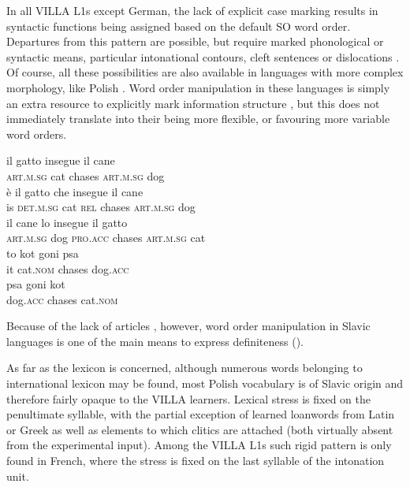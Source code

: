 In all VILLA L1s except German, the lack of explicit case marking results in syntactic functions being assigned based on the default SO word order. Departures from this pattern  are possible, but require marked phonological or syntactic means, particular intonational contours, cleft sentences  or dislocations . Of course, all these possibilities are also available in languages with more complex morphology, like Polish . Word order manipulation in these languages is simply an extra resource to explicitly mark information structure , but this does not immediately translate into their being more flexible, or favouring more variable word orders. 

\ea%
    \label{ex:02:6}
    \ea\label{ex:02:6a}
    \gll    il gatto insegue il cane\\
            \textsc{art.m.sg}  cat  chases \textsc{art.m.sg} dog\\
    \ex\label{ex:02:6b}
    \gll    è il gatto che insegue il cane\\
            is  \textsc{det.m.sg}  cat  \textsc{rel}  chases    \textsc{art.m.sg}  dog\\
    \ex\label{ex:02:6c}
    \gll    il cane lo insegue il gatto\\
            \textsc{art.m.sg}  dog  \textsc{pro.acc}  chases    \textsc{art.m.sg}  cat\\
    \ex\label{ex:02:6d}
    \gll    to kot goni psa\\
            it  cat.\textsc{nom}  chases    dog.\textsc{acc}\\
    \ex\label{ex:02:6e}
    \gll    psa goni kot\\
            dog.\textsc{acc}  chases    cat.\textsc{nom}\\
    \z
\z

Because of the lack of articles \citep{Dryer2013a}, however, word order manipulation in Slavic languages is one of the main means to express definiteness (\citealt{JacennikDryer1992, Siewierska1993}).

As far as the lexicon is concerned, although numerous words belonging to international lexicon may be found, most Polish vocabulary is of Slavic origin and therefore fairly opaque to the VILLA learners. Lexical stress is fixed on the penultimate syllable, with the partial exception of learned loanwords from Latin or Greek as well as elements to which clitics are attached (both virtually absent from the experimental input). Among the VILLA L1s such rigid pattern is only found in French, where the stress is fixed on the last syllable of the intonation unit. 

